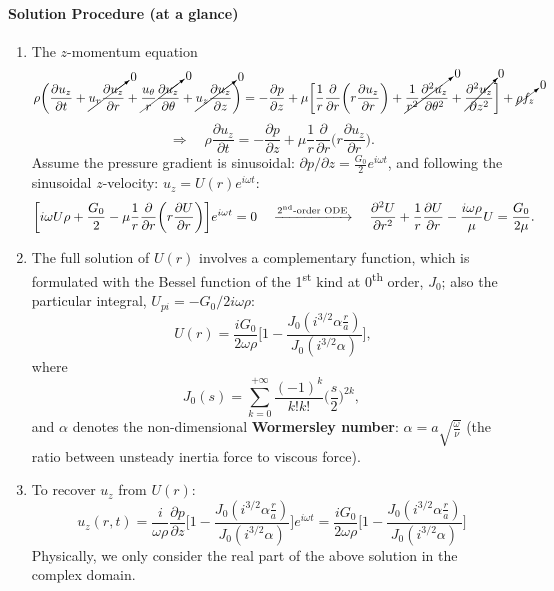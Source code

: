 \documentclass[a4paper]{article}
\begin{document}
\paragraph{Solution Procedure (at a glance)}
\begin{enumerate}[label=\underline{\textit{Step \arabic*}}]
    \item The $z$-momentum equation
    \[
        \rho \bigg(\frac{\partial u_{z}}{\partial t} + \cancelto{0}{u_{r} \frac{\partial u_{z}}{\partial r}} + \cancelto{0}{\frac{u_{\theta}}{r}\frac{\partial u_{z}}{\partial \theta}} + \cancelto{0}{u_{z}\frac{\partial u_{z}}{\partial z}} \bigg) = -\frac{\partial p}{\partial z} + \mu \bigg[ \frac{1}{r}\frac{\partial}{\partial r} \bigg(r \frac{\partial u_{z}}{\partial r}\bigg) + \cancelto{0}{\frac{1}{r^{2}} \frac{\partial^{2} u_{z}}{\partial \theta^{2}}} + \cancelto{0}{\frac{\partial^{2} u_{z}}{\partial z^{2}}} \bigg] + \cancelto{0}{\rho f_{z}}
    \]
    \[
        \Rightarrow \quad \rho \frac{\partial u_z}{\partial t} = -\frac{\partial p}{\partial z} + \mu \frac{1}{r} \frac{\partial}{\partial r} \bigg(r\frac{\partial u_z}{\partial r} \bigg).
    \]
    Assume the pressure gradient is sinusoidal: $\displaystyle \partial p / \partial z = \frac{G_0}{2}e^{i\omega t}$, and following the sinusoidal $z$-velocity: $u_z = U(r) e^{i\omega t}$:
    \[
        \bigg[ i\omega U \rho + \frac{G_0}{2} - \mu \frac{1}{r}\frac{\partial}{\partial r} \bigg(r\frac{\partial U}{\partial r}\bigg) \bigg] e^{i\omega t} = 0
        \quad \xrightarrow[]{\text{2\textsuperscript{nd}-order ODE}} \quad
        \frac{\partial^2 U}{\partial r^2} + \frac{1}{r} \frac{\partial U}{\partial r} - \frac{i\omega \rho}{\mu} U = \frac{G_0}{2\mu}.
    \]

    \item The full solution of $U(r)$ involves a complementary function, which is formulated with the Bessel function of the 1\textsuperscript{st} kind at 0\textsuperscript{th} order, $J_0$; also the particular integral, $U_{pi} = -G_0 / 2i\omega \rho$:
    \[\
        U(r) = \frac{iG_{0}}{2\omega \rho}\bigg[ 1- \frac{J_{0}(i^{3/2}\alpha \frac{r}{a})}{J_{0}(i^{3/2}\alpha)} \bigg],
    \]
    where
    \[
        J_0(s) = \sum_{k=0}^{+\infty} \frac{(-1)^k}{k!k!}\bigg(\frac{s}{2}\bigg)^{2k},
    \]
    and $\alpha$ denotes the non-dimensional \textbf{Wormersley number}: $\displaystyle \alpha = a \sqrt{\frac{\omega}{\nu}}$ (the ratio between unsteady inertia force to viscous force).
    
    \item To recover $u_z$ from $U(r)$:
    \[
        u_{z}(r,t) = \frac{i}{\omega \rho} \frac{\partial p}{\partial z} \bigg[ 1- \frac{J_{0}(i^{3/2}\alpha \frac{r}{a})}{J_{0}(i^{3/2}\alpha)} \bigg] e^{i\omega t} = \frac{iG_{0}}{2\omega \rho}\bigg[ 1- \frac{J_{0}(i^{3/2}\alpha \frac{r}{a})}{J_{0}(i^{3/2}\alpha)} \bigg] 
    \]
    Physically, we only consider the real part of the above solution in the complex domain.
\end{enumerate}
\end{document}

